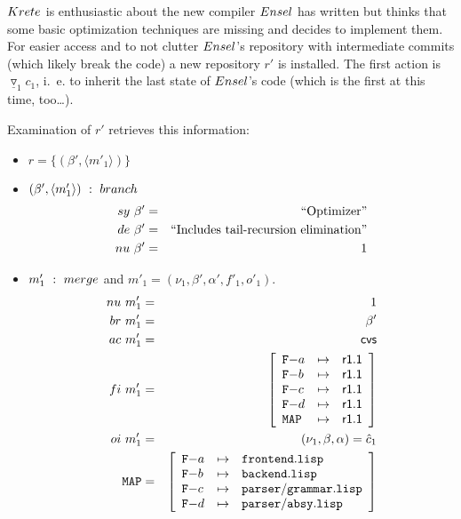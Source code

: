 \documentclass[fleqn, 10pt, a4paper]{report} \usepackage{amssymb}
\begin{document}
$\mathnormal{Krete}$ is enthusiastic about the new compiler
$\mathnormal{Ensel}$ has written but thinks that some basic
optimization techniques are missing and decides to implement them. For
easier access and to not clutter $\mathnormal{Ensel}$'s repository
with intermediate commits (which likely break the code) a new
repository $r'$ is installed. The first action is
$\underline{\triangledown}_1 c_1$, i.~e. to inherit the last state of
$\mathnormal{Ensel}$'s code (which is the first at this
time, too\ldots).

Examination of $r'$ retrieves this information:

\begin{itemize}
\item $r=\{(\beta', \langle m'_1\rangle)\}$
\item $(\beta',\langle m'_1\rangle)\ :\ \mathnormal{branch}$
  \begin{eqnarray*}
    \mathnormal{sy}\ \beta' &=& \mbox{``Optimizer''} \\
    \mathnormal{de}\ \beta' &=& \mbox{``Includes tail-recursion elimination''} \\
    \mathnormal{nu}\ \beta' &=& 1
  \end{eqnarray*}

\item $m'_1\ :\ \mathnormal{merge}$ and $m'_1=(\nu_1, \beta', \alpha',
  f'_1, o'_1)$.
  \begin{eqnarray*}
    \mathnormal{nu}\ m'_1 &=& 1 \\
    \mathnormal{br}\ m'_1 &=& \beta' \\
    \mathnormal{ac}\ m'_1 &=& \mathsf{cvs} \\
    \mathnormal{fi}\ m'_1 &=& \left[
      \begin{array}{lcl}
        \mathtt{F-}a & \mapsto & \mathsf{r1.1} \\
        \mathtt{F-}b & \mapsto & \mathsf{r1.1} \\
        \mathtt{F-}c & \mapsto & \mathsf{r1.1} \\
        \mathtt{F-}d & \mapsto & \mathsf{r1.1} \\
        \mathtt{MAP} & \mapsto & \mathsf{r1.1} \\
      \end{array}\right] \\
    \mathnormal{oi}\ m'_1 &=& (\nu_1, \beta, \alpha) = \hat c_1 \\
    \mathtt{MAP} &=& \left[
      \begin{array}{lcl}
        \mathtt{F-}a &\mapsto& \mathtt{frontend.lisp} \\
        \mathtt{F-}b &\mapsto& \mathtt{backend.lisp} \\
        \mathtt{F-}c &\mapsto& \mathtt{parser/grammar.lisp} \\
        \mathtt{F-}d &\mapsto& \mathtt{parser/absy.lisp} \\
      \end{array}\right]
  \end{eqnarray*}
\end{itemize}
\end{document}
